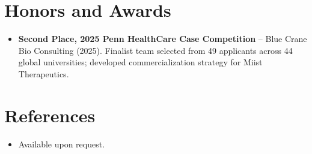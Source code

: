 \documentclass[11pt,a4paper,sans]{moderncv}
\begin{document}

\section{Honors and Awards}
\vspace{1pt}
\begin{itemize}
\item{\textbf{Second Place, 2025 Penn HealthCare Case Competition} -- Blue Crane Bio Consulting (2025). Finalist team selected from 49 applicants across 44 global universities; developed commercialization strategy for Miist Therapeutics.}
\end{itemize}


\section{References}
\vspace{1pt}
\begin{itemize}
\item{Available upon request.}
\end{itemize}
\end{document}
